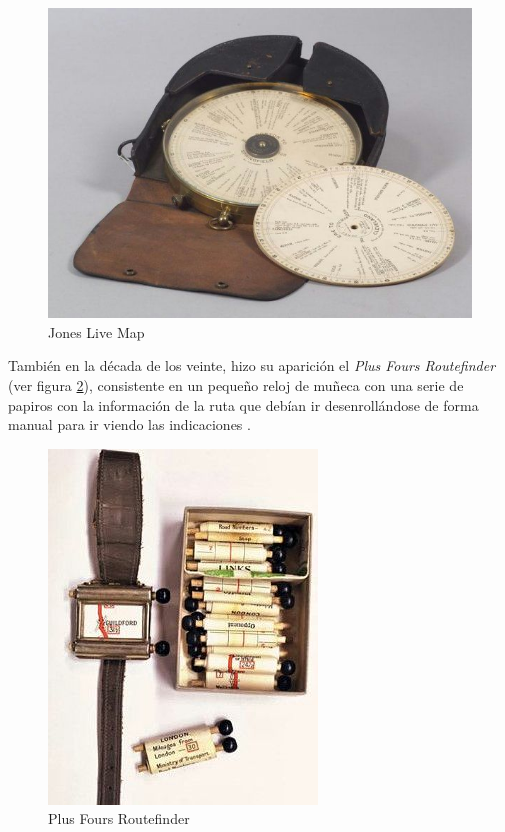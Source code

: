\begin{figure}[hbtp]
\centering
\includegraphics[scale=0.5, fbox={\fboxrule} 4mm]{images/03-antecedentes/06-jones_live_map.png}
\caption{Jones Live Map}
\label{fig:jones_live_map}
\end{figure}

También en la década de los veinte, hizo su aparición el \textit{Plus Fours Routefinder} (ver figura \ref{fig:plus_fours_routefinder}), consistente en un pequeño reloj de muñeca con una serie de papiros con la información de la ruta que debían ir desenrollándose de forma manual para ir viendo las indicaciones \cite{Plus14}.

\begin{figure}[hbtp]
\centering
\includegraphics[scale=0.5, fbox={\fboxrule} 4mm]{images/03-antecedentes/07-plus_fours_routefinder.png}
\caption{Plus Fours Routefinder}
\label{fig:plus_fours_routefinder}
\end{figure}

